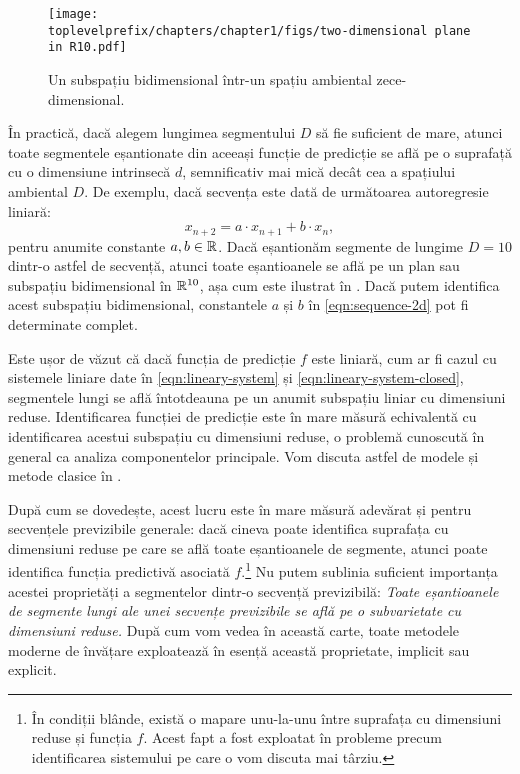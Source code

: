 \documentclass[../../book-main_ro.tex]{subfiles}
\begin{document}
\begin{figure}[t]
\centering
\texttt{[image: \\toplevelprefix/chapters/chapter1/figs/two-dimensional plane in R10.pdf]}
    \caption{Un subspațiu bidimensional într-un spațiu ambiental zece-dimensional.}
    \label{fig:lowdimplane}
\end{figure}
În practică, dacă alegem lungimea segmentului $D$ să fie suficient de mare, atunci toate segmentele eșantionate din aceeași funcție de predicție se află pe o suprafață cu o dimensiune intrinsecă $d$, semnificativ mai mică decât cea a spațiului ambiental $D$. De exemplu, dacă secvența este dată de următoarea autoregresie liniară:
\begin{equation}
    x_{n+2} = a\cdot x_{n+1} + b\cdot x_n,
    \label{eqn:sequence-2d}
\end{equation}
pentru anumite constante $a, b \in \mathbb{R}$. Dacă eșantionăm segmente de lungime $D =10$ dintr-o astfel de secvență, atunci toate eșantioanele se află pe un plan sau subspațiu bidimensional în $\mathbb{R}^{10}$, așa cum este ilustrat în . Dacă putem identifica acest subspațiu bidimensional, constantele $a$ și $b$ în \eqref{eqn:sequence-2d} pot fi determinate complet.


Este ușor de văzut că dacă funcția de predicție $f$ este liniară, cum ar fi cazul cu sistemele liniare date în \eqref{eqn:lineary-system} și \eqref{eqn:lineary-system-closed}, segmentele lungi se află întotdeauna pe un anumit subspațiu liniar cu dimensiuni reduse. Identificarea funcției de predicție este în mare măsură echivalentă cu identificarea acestui subspațiu cu dimensiuni reduse, o problemă cunoscută în general ca analiza componentelor principale. Vom discuta astfel de modele și metode clasice în .

După cum se dovedește, acest lucru este în mare măsură adevărat și pentru secvențele previzibile generale: dacă cineva poate identifica suprafața cu dimensiuni reduse pe care se află toate eșantioanele de segmente, atunci poate identifica funcția predictivă asociată $f$.\footnote{În condiții blânde, există o mapare unu-la-unu între suprafața cu dimensiuni reduse și funcția $f$. Acest fapt a fost exploatat în probleme precum identificarea sistemului pe care o vom discuta mai târziu.} Nu putem sublinia suficient importanța acestei proprietăți a segmentelor dintr-o secvență previzibilă: {\em Toate eșantioanele de segmente lungi ale unei secvențe previzibile se află pe o subvarietate cu dimensiuni reduse.} După cum vom vedea în această carte, toate metodele moderne de învățare exploatează în esență această proprietate, implicit sau explicit.
\end{document}
